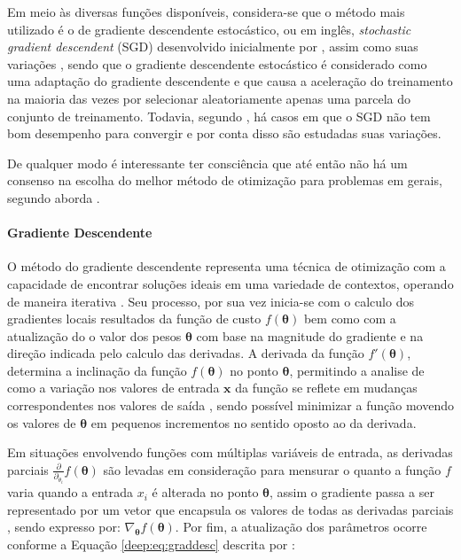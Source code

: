 Em meio às diversas funções disponíveis, considera-se que o método mais utilizado é o de gradiente descendente estocástico, ou em inglês, \textit{stochastic gradient descendent} (SGD) desenvolvido inicialmente por \cite{cauchy1847methode}, assim como suas variações \citep{Goodfellow2016}, sendo que o gradiente descendente estocástico é considerado como uma adaptação do gradiente descendente e que causa a aceleração do treinamento na maioria das vezes por selecionar aleatoriamente apenas uma parcela do conjunto de treinamento. Todavia, segundo \cite{Goodfellow2016}, há casos em que o SGD não tem bom desempenho para convergir e por conta disso são estudadas suas variações.

De qualquer modo é interessante ter consciência que até então não há um consenso na escolha do melhor método de otimização para problemas em gerais, segundo aborda \cite{Goodfellow2016}.


\paragraph{Gradiente Descendente}
\label{deep:optimization:graddesc}
O método do gradiente descendente representa uma técnica de otimização com a capacidade de encontrar soluções ideais em uma variedade de contextos, operando de maneira iterativa \citep{Geron2017Hands-onSystems}. Seu processo, por sua vez inicia-se com o calculo dos gradientes locais resultados da função de custo $f(\boldsymbol{\theta})$ bem como com a atualização do o valor dos pesos $\boldsymbol{\theta}$ com base na magnitude do gradiente e na direção indicada pelo calculo das derivadas. A derivada da função $f'(\boldsymbol{\theta})$, determina a inclinação da função $f(\boldsymbol{\theta})$ no ponto $\boldsymbol{\theta}$, permitindo a analise de como a variação nos valores de entrada $\boldsymbol{x}$ da função se reflete em mudanças correspondentes nos valores de saída \citep{Goodfellow2016}, sendo possível minimizar a função movendo os valores de $\boldsymbol{\theta}$ em pequenos incrementos no sentido oposto ao da derivada.

Em situações envolvendo funções com múltiplas variáveis de entrada, as derivadas parciais $\frac{\partial}{\partial_{\theta_{i}}}f(\boldsymbol{\theta})$ são levadas em consideração para mensurar o quanto a função $f$ varia quando a entrada $x_i$ é alterada no ponto $\boldsymbol{\theta}$, assim o gradiente passa a ser representado por um vetor que encapsula os valores de todas as derivadas parciais \citep{Goodfellow2016}, sendo expresso por: $\nabla_{\boldsymbol{\theta}} f(\boldsymbol{\theta})$.  Por fim, a atualização dos parâmetros ocorre conforme a Equação \ref{deep:eq:graddesc} descrita por \cite{Goodfellow2016}:

